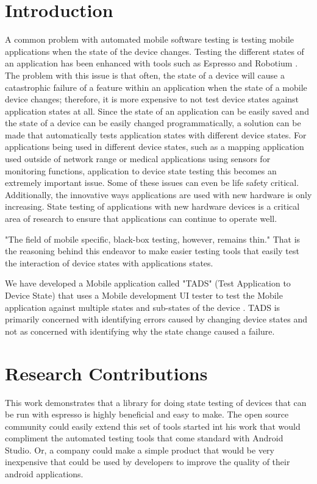 \section{Introduction}
A common problem with automated mobile software testing is testing mobile applications when the state of the device changes.  Testing the different states of an application has been enhanced with tools such as Espresso and Robotium \cite{optimusinformationinc2016}. The problem with this issue is that often, the state of a device will cause a catastrophic failure of a feature within an application when the state of a mobile device changes; therefore, it is more expensive to not test device states against application states at all.  Since the state of an application can be easily saved and the state of a device can be easily changed programmatically, a solution can be made that automatically tests application states with different device states.  For applications being used in different device states, such as a mapping application used outside of network range or medical applications using sensors for monitoring functions, application to device state testing this becomes an extremely important issue.  Some of these issues can even be life safety critical.  Additionally, the innovative ways applications are used with new hardware is only increasing.  State testing of applications with new hardware devices is a critical area of research to ensure that applications can continue to operate well. 

"The field of mobile specific, black-box testing, however, remains thin." \cite{paulovsky2017high}  That is the reasoning behind this endeavor to make easier testing tools that easily test the interaction of device states with applications states.  

We have developed a Mobile application called "TADS" (Test Application to Device State) that uses a Mobile development UI tester to test the Mobile application against multiple states and sub-states of the device \cite{366932}.  TADS is primarily concerned with identifying errors caused by changing device states and not as concerned with identifying why the state change caused a failure.

\section{Research Contributions}
This work demonstrates that a library for doing state testing of devices that can be run with espresso is highly beneficial and easy to make.  The open source community could easily extend this set of tools started int his work that would compliment the automated testing tools that come standard with Android Studio.  Or, a company could make a simple product that would be very inexpensive that could be used by developers to improve the quality of their android applications. 


